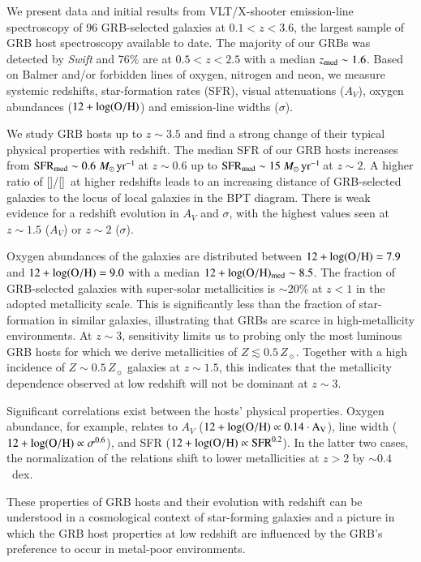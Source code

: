 \documentclass[traditabstract, longauth]{aa}
\newcommand{\oh}{12+\log(\rm{O/H})}
\newcommand{\oii}{[\ion{O}{ii}]}
\newcommand{\oiii}{[\ion{O}{iii}]}
\newcommand{\Msunyr}{$M_\odot\,\rm{yr}^{-1}$}
\begin{document}
\abstract
{We present data and initial results from VLT/X-shooter emission-line spectroscopy of  {96} GRB-selected galaxies at $0.1<z<3.6$, the largest sample of GRB host spectroscopy available to date. The majority of our GRBs was detected by \textit{Swift} and 76\% are at $0.5<z<2.5$ with a median $z_{\rm{med}}\sim1.6$. Based on Balmer and/or forbidden lines of oxygen, nitrogen and neon, we measure systemic redshifts, star-formation rates (SFR), visual attenuations ($A_V$), oxygen abundances ($\oh$) and emission-line widths ($\sigma$). 

We study GRB hosts up to $z\sim3.5$ and find a strong change of their typical physical properties with redshift. The median SFR of our GRB hosts increases from $\rm{SFR_{med}}\sim0.6$\,\Msunyr\,at $z\sim0.6$ up to $\rm{SFR_{med}}\sim15$\,\Msunyr\,at $z\sim2$. A higher ratio of \oiii/\oii\, at higher redshifts leads to an increasing distance of GRB-selected galaxies to the locus of local galaxies in the BPT diagram. There is weak evidence for a redshift evolution in $A_V$ and $\sigma$, with the highest values seen at $z\sim1.5$ ($A_V$) or $z\sim2$ ($\sigma$). 

 {Oxygen abundances of the galaxies are distributed between $\oh=7.9$ and $\oh=9.0$ with a median $\oh_{\rm{med}}\sim 8.5$. The fraction of GRB-selected galaxies with super-solar metallicities is $\sim 20\%$ at $z<1$ in the adopted metallicity scale.}  This is significantly less than the fraction of star-formation in similar galaxies, illustrating that GRBs are scarce in high-metallicity environments. At $z\sim3$, sensitivity limits us to probing only the most luminous GRB hosts for which we derive metallicities of $Z\lesssim0.5\,Z_{\sun}$. Together with a high incidence of $Z\sim0.5\,Z_{\sun}$ galaxies at $z\sim1.5$, this indicates that the metallicity dependence observed at low redshift will not be dominant at $z\sim3$.

Significant correlations exist between the hosts' physical properties. Oxygen abundance, for example, relates to $A_V$ ($\oh \propto 0.14\cdot A_V$), line width ($\oh \propto\sigma^{0.6}$), and SFR ($\oh\propto\mathrm{SFR}^{0.2}$). In the latter two cases, the normalization of the relations shift to lower metallicities at $z>2$ by $\sim0.4$~dex. 

These properties of GRB hosts and their evolution with redshift can be understood in a cosmological context of star-forming galaxies and a picture in which the GRB host properties at low redshift are influenced by the GRB's preference to occur in metal-poor environments.}
\end{document}
